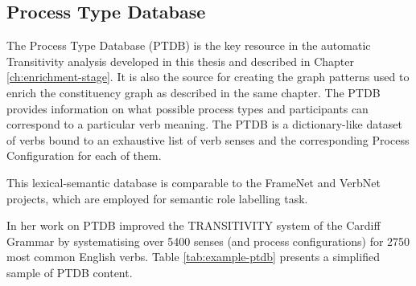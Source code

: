 \subsection{Process Type Database}
\label{sec:ptdb-description-technical}

    The Process Type Database (PTDB) \citep{Neale2002} is the key resource in the automatic Transitivity analysis developed in this thesis and described in Chapter \ref{ch:enrichment-stage}. It is also the source for creating the graph patterns used to enrich the constituency graph as described in the same chapter. The PTDB provides information on what possible process types and participants can correspond to a particular verb meaning. The PTDB is a dictionary-like dataset of verbs bound to an exhaustive list of verb senses and the corresponding Process Configuration for each of them.
    
    This lexical-semantic database is comparable to the FrameNet \citep{Fillmore82-frames} and VerbNet \citep{Kipper-Schuler2005-verbnet,schuler2005verbnet} projects, which are employed for semantic role labelling task.
    
    In her work on PTDB \citet{Neale2002} improved the TRANSITIVITY system of the Cardiff Grammar by systematising over 5400 senses (and process configurations) for 2750 most common English verbs. Table \ref{tab:example-ptdb} presents a simplified sample of PTDB content.

    \begin{table}[!ht]
        \centering
        \caption{An example of records in PTDB}
        \label{tab:example-ptdb}
    \end{table}

